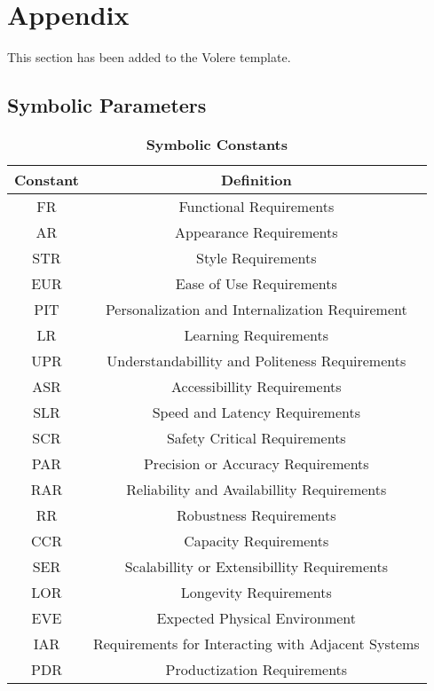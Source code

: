\documentclass[12pt, titlepage]{article}
\begin{document}




\section{Appendix}

This section has been added to the Volere template.

\subsection{Symbolic Parameters}

\begin{table}[htp]
\caption{\bf Symbolic Constants}
\centering
\begin{tabular}{ |c|c| } 
 \hline
 \textbf{Constant} & \textbf{Definition}\\ 
 \hline
FR & Functional Requirements\\
 \hline
AR & Appearance Requirements\\
 \hline
STR & Style Requirements\\
 \hline
EUR & Ease of Use Requirements\\
 \hline
PIT & Personalization and Internalization Requirement\\
 \hline
LR & Learning Requirements\\
 \hline
UPR & Understandabillity and Politeness Requirements\\
 \hline
ASR & Accessibillity Requirements\\
 \hline
SLR & Speed and Latency Requirements\\
 \hline
SCR & Safety Critical Requirements\\
 \hline
PAR & Precision or Accuracy Requirements\\
 \hline
RAR & Reliability and Availabillity Requirements\\
 \hline
RR & Robustness Requirements\\
 \hline
CCR & Capacity Requirements\\
 \hline
SER & Scalabillity or Extensibillity Requirements\\
 \hline
LOR & Longevity Requirements\\
 \hline
EVE & Expected Physical Environment\\
 \hline
IAR & Requirements for Interacting with Adjacent Systems\\
 \hline
PDR & Productization Requirements\\
 \hline

\end{tabular}
\end{table}
\end{document}
